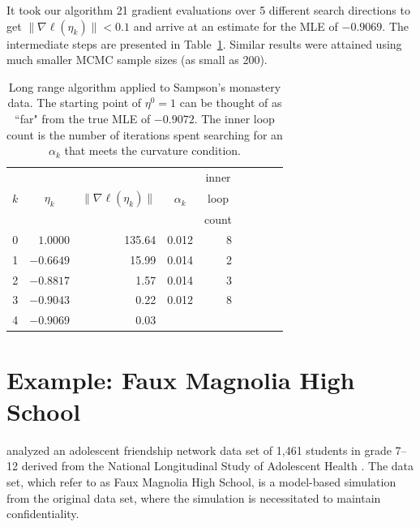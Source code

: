 It took our algorithm 21 gradient evaluations over 5 different search 
directions to get $\lVert \nabla \ell( \eta_k ) \rVert < 0.1$ and arrive at an 
estimate for the MLE of  $-0.9069$.  The intermediate steps are presented in 
Table~\ref{T:Sampson redo}.  Similar results were attained using much smaller 
MCMC sample sizes (as small as 200).

\begin{table}[h!] 
\caption[Long range algorithm applied to Sampson's monastery data]{
Long range algorithm applied to Sampson's 
monastery data.  The starting point of $\eta^0 = 1$ can be thought of as ``far" from the
true MLE of $-0.9072$.  The inner loop count is the number of iterations spent 
searching for an $\alpha_k$ that meets the curvature condition.  
}
\begin{center}
\begin{tabular}{rrrrrrlrr}
  \hline
    &  &  &  & \multicolumn{1}{c}{inner}\\
  \multicolumn{1}{c}{$k$} & 
  \multicolumn{1}{c}{$\eta_k$} &
  \multicolumn{1}{c}{$\lVert \nabla \ell(\eta_k) \rVert$} &
  \multicolumn{1}{c}{$\alpha_k$} &
  \multicolumn{1}{c}{loop }\\
    &  &  &  & \multicolumn{1}{c}{count}\\
  \hline
   0 &  $1.0000$ & 135.64 &  0.012 & 8\\
   1 & $-0.6649$ & 15.99  &  0.014 & 2 \\
   2 & $-0.8817$ & 1.57   &  0.014 & 3 \\
   3 & $-0.9043$ & 0.22   &  0.012 & 8 \\
   4 & $-0.9069$ & 0.03   &  &  \\
   \hline
\end{tabular} \label{T:Sampson redo}
\end{center}
\end{table}


\section{Example: Faux Magnolia High School} \label{S:Example:FauxMagnolia}
\citet{advancesp*,statnet-tutorial} analyzed an adolescent friendship network data set 
of 1,461 students in grade 7--12 derived from the National Longitudinal Study of 
Adolescent Health \citep{Resnick:1997}.  The data set, which \citeauthor{statnet-tutorial} refer to as Faux 
Magnolia High School, is a model-based simulation from the original data set, where 
the simulation is necessitated to maintain confidentiality.

